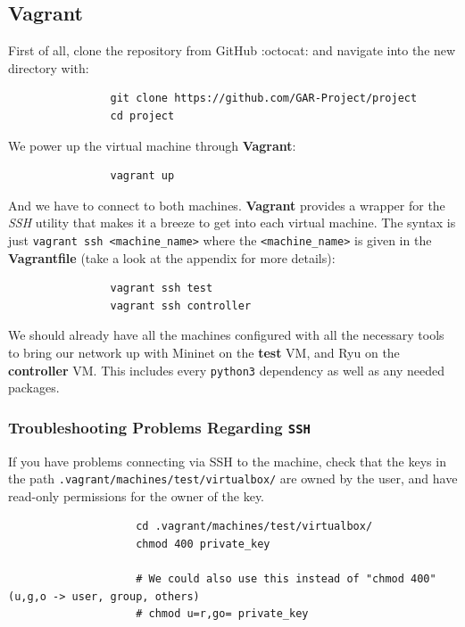 \documentclass[12pt]{report}
\begin{document}
		\subsection{Vagrant}
			First of all, clone the repository from GitHub :octocat: and navigate into the new directory with:

			\begin{verbatim}
				git clone https://github.com/GAR-Project/project
				cd project
			\end{verbatim}

			We power up the virtual machine through \textbf{Vagrant}:

			\begin{verbatim}
				vagrant up
			\end{verbatim}

			And we have to connect to both machines. \textbf{Vagrant} provides a wrapper for the \textit{SSH} utility that makes it a breeze to get into each virtual machine. The syntax is just \texttt{vagrant ssh <machine_name>} where the \texttt{<machine_name>} is given in the \textbf{Vagrantfile} (take a look at the appendix for more details):

			\begin{verbatim}
				vagrant ssh test
				vagrant ssh controller
			\end{verbatim}

			We should already have all the machines configured with all the necessary tools to bring our network up with Mininet on the \textbf{test} VM, and Ryu on the \textbf{controller} VM. This includes every \texttt{python3} dependency as well as any needed packages.

			\subsubsection{Troubleshooting Problems Regarding \texttt{SSH}}
				If you have problems connecting via SSH to the machine, check that the keys in the path \texttt{.vagrant/machines/test/virtualbox/} are owned by the user, and have read-only permissions for the owner of the key. 

				\begin{verbatim}
					cd .vagrant/machines/test/virtualbox/
					chmod 400 private_key

					# We could also use this instead of "chmod 400" (u,g,o -> user, group, others)
					# chmod u=r,go= private_key
				\end{verbatim}
\end{document}
